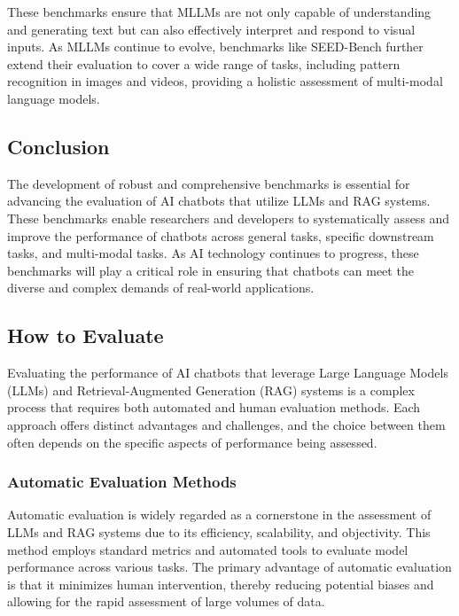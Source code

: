 These benchmarks ensure that MLLMs are not only capable of understanding and generating text but can also effectively interpret and respond to visual inputs. As MLLMs continue to evolve, benchmarks like SEED-Bench further extend their evaluation to cover a wide range of tasks, including pattern recognition in images and videos, providing a holistic assessment of multi-modal language models.

\subsection{Conclusion}

The development of robust and comprehensive benchmarks is essential for advancing the evaluation of AI chatbots that utilize LLMs and RAG systems. These benchmarks enable researchers and developers to systematically assess and improve the performance of chatbots across general tasks, specific downstream tasks, and multi-modal tasks. As AI technology continues to progress, these benchmarks will play a critical role in ensuring that chatbots can meet the diverse and complex demands of real-world applications.

\subsection{How to Evaluate}

Evaluating the performance of AI chatbots that leverage Large Language Models (LLMs) and Retrieval-Augmented Generation (RAG) systems is a complex process that requires both automated and human evaluation methods. Each approach offers distinct advantages and challenges, and the choice between them often depends on the specific aspects of performance being assessed.

\subsubsection{Automatic Evaluation Methods}

Automatic evaluation is widely regarded as a cornerstone in the assessment of LLMs and RAG systems due to its efficiency, scalability, and objectivity. This method employs standard metrics and automated tools to evaluate model performance across various tasks. The primary advantage of automatic evaluation is that it minimizes human intervention, thereby reducing potential biases and allowing for the rapid assessment of large volumes of data.

